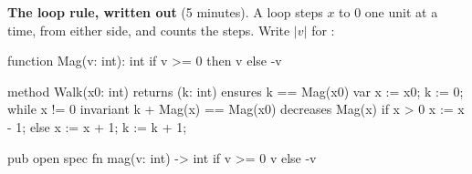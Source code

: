 \documentclass[11pt]{article}
\begin{document}
\begin{problem}\label{prob:B2}
\textbf{The loop rule, written out} (5 minutes). A loop steps $x$ to 0 one
unit at a time, from either side, and counts the steps. Write $\lvert v\rvert$
for :
\begin{dafnycode}
function Mag(v: int): int
{
  if v >= 0 then v else -v
}

method Walk(x0: int) returns (k: int)
  ensures k == Mag(x0)
{
  var x := x0;
  k := 0;
  while x != 0
    invariant k + Mag(x) == Mag(x0)
    decreases Mag(x)
  {
    if x > 0 {
      x := x - 1;
    } else {
      x := x + 1;
    }
    k := k + 1;
  }
}
\end{dafnycode}
\begin{veruscode}
pub open spec fn mag(v: int) -> int {
    if v >= 0 {
        v
    } else {
        -v
    }
}


\end{veruscode}
\end{problem}
\end{document}
